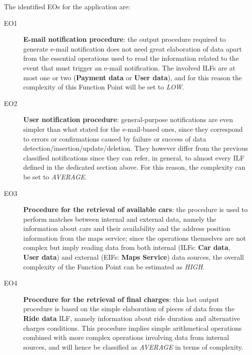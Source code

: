 The identified EOs for the application are:
\begin{description}
\item[EO1] \textbf{E-mail notification procedure}: the output procedure required to generate e-mail notification does not need great elaboration of data apart from the essential operations used to read the information related to the event that must trigger an e-mail notification. The involved ILFs are at most one or two (\textbf{Payment data} or \textbf{User data}), and for this reason the complexity of this Function Point will be set to \textit{LOW}.
\item[EO2] \textbf{User notification procedure}: general-purpose notifications are even simpler than what stated for the e-mail-based ones, since they correspond to errors or confirmations caused by failure or success of data detection/insertion/update/deletion. They however differ from the previous classified notifications since they can refer, in general, to almost every ILF defined in the dedicated section above. For this reason, the complexity can be set to \textit{AVERAGE}.
\item[EO3] \textbf{Procedure for the retrieval of available cars}: the procedure is used to perform matches between internal and external data, namely the information about cars and their availability and the address position information from the maps service; since the operations themselves are not complex but imply reading data from both internal (ILFs: \textbf{Car data}, \textbf{User data}) and external (EIFs: \textbf{Maps Service}) data sources, the overall complexity of the Function Point can be estimated as \textit{HIGH}.
\item[EO4] \textbf{Procedure for the retrieval of final charges}: this last output procedure is based on the simple elaboration of pieces of data from the \textbf{Ride data} ILF, namely information about ride duration and alternative charges conditions. This procedure implies simple arithmetical operations combined with more complex operations involving data from internal sources, and will hence be classified as \textit{AVERAGE} in terms of complexity.
\end{description}

